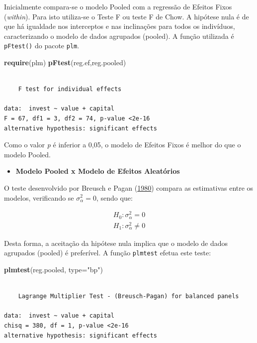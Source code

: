 \documentclass[12pt,brazil,oneside]{book}
\newenvironment{Shaded}{\begin{snugshade}}{\end{snugshade}}
\newcommand{\DataTypeTok}[1]{\textcolor[rgb]{0.13,0.29,0.53}{#1}}
\newcommand{\KeywordTok}[1]{\textcolor[rgb]{0.13,0.29,0.53}{\textbf{#1}}}
\newcommand{\NormalTok}[1]{#1}
\newcommand{\StringTok}[1]{\textcolor[rgb]{0.31,0.60,0.02}{#1}}
\providecommand{\tightlist}{%
  \setlength{\itemsep}{0pt}\setlength{\parskip}{0pt}}
\begin{document}
Inicialmente compara-se o modelo Pooled com a regressão de Efeitos Fixos (\emph{within}). Para isto utiliza-se o Teste F ou teste F de Chow. A hipótese nula é de que há igualdade nos interceptos e nas inclinações para todos os indivíduos, caracterizando o modelo de dados agrupados (pooled). A função utilizada é \texttt{pFtest()} do pacote \texttt{plm}.

\begin{Shaded}
\begin{Highlighting}[]
\KeywordTok{require}\NormalTok{(plm)}
\KeywordTok{pFtest}\NormalTok{(reg.ef,reg.pooled)}
\end{Highlighting}
\end{Shaded}

\begin{verbatim}

    F test for individual effects

data:  invest ~ value + capital
F = 67, df1 = 3, df2 = 74, p-value <2e-16
alternative hypothesis: significant effects
\end{verbatim}

Como o valor \emph{p} é inferior a 0,05, o modelo de Efeitos Fixos é melhor do que o modelo Pooled.

\begin{itemize}
\tightlist
\item
  \textbf{Modelo Pooled x Modelo de Efeitos Aleatórios}
\end{itemize}

O teste desenvolvido por Breusch e Pagan (\protect\hyperlink{ref-breusch1980}{1980}) compara as estimativas entre os modelos, verificando se \(\sigma^{2}_{\alpha} = 0\), sendo que:

\[
 \begin{matrix}
H_{0}: \sigma^{2}_{\alpha} = 0 \\
H_{1}: \sigma^{2}_{\alpha} \neq 0
 \end{matrix}
\]

Desta forma, a aceitação da hipótese nula implica que o modelo de dados agrupados (pooled) é preferível. A função \texttt{plmtest} efetua este teste:

\begin{Shaded}
\begin{Highlighting}[]
\KeywordTok{plmtest}\NormalTok{(reg.pooled, }\DataTypeTok{type=}\StringTok{"bp"}\NormalTok{)}
\end{Highlighting}
\end{Shaded}

\begin{verbatim}

    Lagrange Multiplier Test - (Breusch-Pagan) for balanced panels

data:  invest ~ value + capital
chisq = 380, df = 1, p-value <2e-16
alternative hypothesis: significant effects
\end{verbatim}
\end{document}
